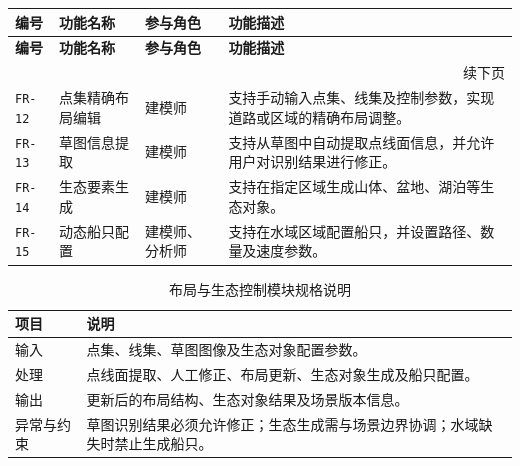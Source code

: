 \documentclass[UTF8,a4paper,10pt]{ctexart}
\begin{document}
{
\renewcommand{\arraystretch}{1.35}

\begin{longtable}{p{1.8cm} p{2.6cm} p{2.2cm} p{6.2cm}}
\toprule
\rowcolor{gray!20}
\textbf{编号} & \textbf{功能名称} & \textbf{参与角色} & \textbf{功能描述} \\
\midrule
\endfirsthead

\toprule
\rowcolor{gray!20}
\textbf{编号} & \textbf{功能名称} & \textbf{参与角色} & \textbf{功能描述} \\
\midrule
\endhead

\midrule
\multicolumn{4}{r}{\small 续下页}\\
\endfoot

\bottomrule
\endlastfoot

\texttt{FR-12} & 点集精确布局编辑 & 建模师 & 支持手动输入点集、线集及控制参数，实现道路或区域的精确布局调整。 \\
\texttt{FR-13} & 草图信息提取 & 建模师 & 支持从草图中自动提取点线面信息，并允许用户对识别结果进行修正。 \\
\texttt{FR-14} & 生态要素生成 & 建模师 & 支持在指定区域生成山体、盆地、湖泊等生态对象。 \\
\texttt{FR-15} & 动态船只配置 & 建模师、分析师 & 支持在水域区域配置船只，并设置路径、数量及速度参数。 \\

\end{longtable}
}

{
\renewcommand{\arraystretch}{1.3}

\begin{table}[H]
\centering
\caption{布局与生态控制模块规格说明}

\begin{tabularx}{\textwidth}{p{2.6cm} Y}
\toprule
{}
\textbf{项目} & \textbf{说明} \\
\midrule

输入 & 点集、线集、草图图像及生态对象配置参数。 \\
处理 & 点线面提取、人工修正、布局更新、生态对象生成及船只配置。 \\
输出 & 更新后的布局结构、生态对象结果及场景版本信息。 \\
异常与约束 & 草图识别结果必须允许修正；生态生成需与场景边界协调；水域缺失时禁止生成船只。 \\

\bottomrule
\end{tabularx}
\end{table}
}
\end{document}
